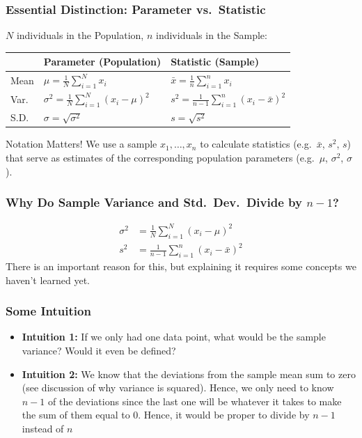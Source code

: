 \documentclass{beamer}
\begin{document}
\begin{frame}
\frametitle{Essential Distinction: Parameter vs.\ Statistic}
	$N$ individuals in the Population, $n$ individuals in the Sample:
	\bigskip
	\begin{tabular}{l|l|l}
		&\textbf{Parameter} (Population)&\textbf{Statistic} (Sample)\\
		\hline
		Mean & $\displaystyle \mu = \frac{1}{N} \sum_{i = 1}^N x_i$	& $\displaystyle \bar{x} = 				\frac{1}{n} \sum_{i = 1}^n x_i$ 
		\\
		Var.\ &$ \displaystyle \sigma^2 = \frac{1}{N}\sum_{i = 1}^N (x_i - \mu)^2$ &$ \displaystyle 			s^2 = \frac{1}{n - 1}\sum_{i = 1}^n(x_i - \bar{x})^2$
		\\
		S.D.\ & $ \displaystyle \sigma = \sqrt{\sigma^2}$ &$ \displaystyle s = \sqrt{s^2}$ 
	\end{tabular}
	\bigskip	
	\begin{alertblock}{Notation Matters!}
		We  use a \alert{sample} $x_1, \hdots, x_n$ to calculate \alert{statistics} (e.g.\ $\bar{x}$, 				$s^2$, $s$) that serve as \alert{estimates} of the corresponding population 							\alert{parameters} (e.g.\ $\mu$, $\sigma^2$, $\sigma$).
	\end{alertblock}
\end{frame}

\begin{frame}
\frametitle{Why Do Sample Variance and Std.\ Dev.\ Divide by $n - 1$? }
	\begin{align*}
		\sigma^2 &= \frac{1}{N}\sum_{i = 1}^N (x_i - \mu)^2
		\\
		s^2 &= \frac{1}{n - 1}\sum_{i = 1}^n(x_i - \bar{x})^2
	\end{align*}
	\alert{There is an important reason for this, but explaining it requires some concepts we 				haven't learned yet. }
\end{frame}

\begin{frame}
\frametitle{Some Intuition}
	\begin{itemize}
		\item \textbf{Intuition 1:} If we only had one data point, what would be the sample 					variance? Would it even be defined?
		\item \textbf{Intuition 2:} We know that the deviations from the sample mean sum to zero 			(see discussion of why variance is squared). Hence, we only need to know $n - 1$ of the 				deviations since the last one will be whatever it takes to make the sum of them equal to 0. 			Hence, it would be proper to divide by $n - 1$ instead of $n$
	\end{itemize}
\end{frame}
\end{document}
